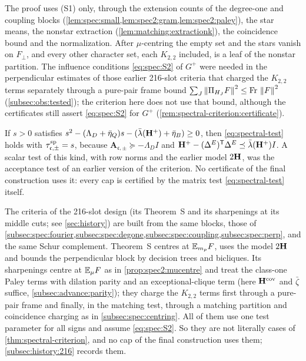 \begin{remark}\label{rem:spectral-criterion:influence}
The proof uses \textup{(S1)} only, through the extension counts of the degree-one
and coupling blocks (\cref{lem:spec:small,lem:spec2:gram,lem:spec2:paley}), the
star means, the nonstar extraction (\cref{lem:matching:extractionk}), the
coincidence bound and the normalization. After $\mu$-centring the empty set and the
stars vanish on $F_\perp$, and every other character set, each $K_{2,2}$ included, is
a leaf of the nonstar partition. The influence conditions \eqref{eq:spec:S2} of $G^+$
were needed in the perpendicular estimates of those earlier 216-slot criteria that
charged the $K_{2,2}$ terms separately through a pure-pair frame bound
$\sum_J\left\|\Pi_{H_J}F\right\|^2\le\mathrm{Fr}\,\left\|F\right\|^2$ (\cref{subsec:obs:tested}); the criterion
here does not use that bound, although the certificates still assert
\eqref{eq:spec:S2} for $G^+$ (\cref{rem:spectral-criterion:certificate}).
\end{remark}

\begin{remark}\label{rem:spectral-criterion:row}
If $s>0$ satisfies $s^2-(\Lambda_D+\bar\eta_Q)s-(\bar\lambda(\mathbf H^+)+\bar\eta_B)\ge0$, then
\eqref{eq:spectral-test} holds with $\tau^{\rm sp}_{\mathfrak c,\pm}=s$, because
$\mathbf A_{\mathfrak c,\pm}\succeq-\Lambda_DI$ and
$\mathbf H^+-(\Delta^E)^{\mathsf T}\Delta^E\preceq\bar\lambda(\mathbf H^+)I$. A scalar test of this
kind, with row norms and the earlier model $2\mathbf H$, was the acceptance test of an
earlier version of the criterion. No certificate of the final construction uses it:
every cap is certified by the matrix test \eqref{eq:spectral-test} itself.
\end{remark}

\begin{remark}\label{rem:spectral-criterion:history}
The criteria of the 216-slot design (its Theorem~S and its
sharpenings at its middle cuts; see \cref{sec:history}) are built
from the same blocks, those of
\cref{subsec:spec:fourier,subsec:spec:degone,subsec:spec:coupling,subsec:spec:perp},
and the same Schur complement. Theorem~S centres at $\mathbb E_{m_p}F$, uses the model
$2\mathbf H$ and bounds the perpendicular block by decision trees and bicliques. Its
sharpenings centre at $\mathbb E_\mu F$ as in \cref{prop:spec2:mucentre} and treat the
class-one Paley terms with dilation parity and an exceptional-clique term (here
$\mathbf H^{\rm cov}$ and $\bar\zeta$ suffice, \cref{subsec:advance:parity}); they charge the
$K_{2,2}$ terms first through a pure-pair frame and finally, in the matching test,
through a matching partition and coincidence charging as in
\cref{subsec:spec:centring}. All of them use one test
parameter for all signs and assume \eqref{eq:spec:S2}. So they are not literally
cases of \cref{thm:spectral-criterion}, and no cap of the final construction uses
them; \cref{subsec:history:216} records them.
\end{remark}


